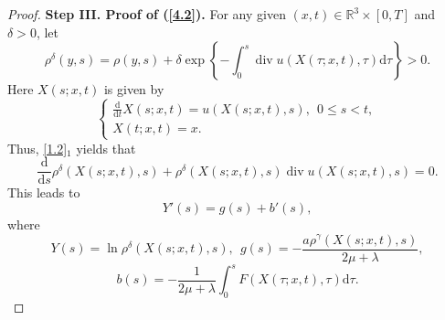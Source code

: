 \documentclass[10pt,a4paper]{amsart}
\DeclareMathOperator{\divv}{div}
\begin{document}
\begin{proof}
{\bf Step III. Proof of (\ref{4.2}).}
For any given $(x,t) \in \mathbb{R}^3 \times [0,T]$ and $\delta>0$, let
$$
\rho^{\delta} (y,s) = \rho (y,s) + \delta \exp\left\{- \int^s_0 \divv u \left( X(\tau; x,t), \tau \right)\mathrm{d} \tau \right\} > 0.
$$
Here $X(s;x,t)$ is given by
$$
\begin{cases}
\frac{\mathrm{d}}{\mathrm{d} t} X (s;x,t) = u \left(X (s;x,t),s \right), \ \ 0 \leq s < t,\\
X(t;x,t) = x.
\end{cases}
$$
Thus, \eqref{1.2}$_1$ yields that
$$
\frac{\mathrm{d}}{\mathrm{d} s} \rho^{\delta} \left(X (s;x,t),s \right) + \rho^{\delta} \left(X (s;x,t),s \right) \divv u \left(X (s;x,t),s \right) = 0.
$$
This leads to
$$
Y'(s) = g(s) + b'(s),
$$
where
$$
Y (s) = \ln \rho^{\delta} \left(X (s;x,t),s \right), \ \ g(s) = - \frac{a \rho^{\gamma} \left(X (s;x,t),s \right)}{2 \mu + \lambda },
$$
$$
b(s) = - \frac{1}{2\mu + \lambda } \int^s_0 F \left(X (\tau;x,t),\tau \right) \mathrm{d} \tau.
$$


\end{proof}
\end{document}
